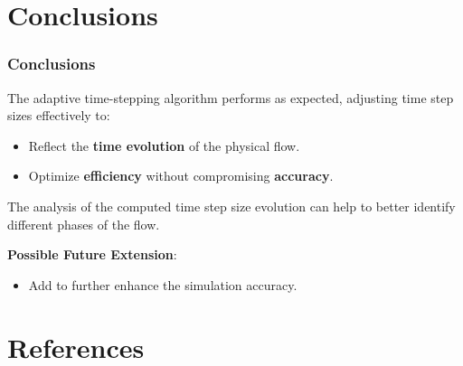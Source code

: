 \documentclass{settings/laserbeam}
\begin{document}
\section{Conclusions}

\begin{frame}
    \begin{cbox}
        {\fontsize{20pt}{7.2}\selectfont {}}
    \end{cbox}
\end{frame}

\begin{frame}
    
    \frametitle{Conclusions}

    \begin{cbox}
        The adaptive time-stepping algorithm performs as expected, adjusting time step sizes effectively to:
        \begin{itemize}
            \item Reflect the \textbf{time evolution} of the physical flow.
            \item Optimize \textbf{efficiency} without compromising \textbf{accuracy}.
        \end{itemize}
    \end{cbox}
    \vspace{0.1cm}
    \begin{info}
        The analysis of the computed time step size evolution can help to better identify different phases of the flow.
    \end{info}
    \vspace{0.1cm}
    \begin{cbox}
        \textbf{Possible Future Extension}:
        \begin{itemize}
            \item Add  to further enhance the simulation accuracy.
        \end{itemize}
    \end{cbox}

\end{frame}

\section{References}
\end{document}
